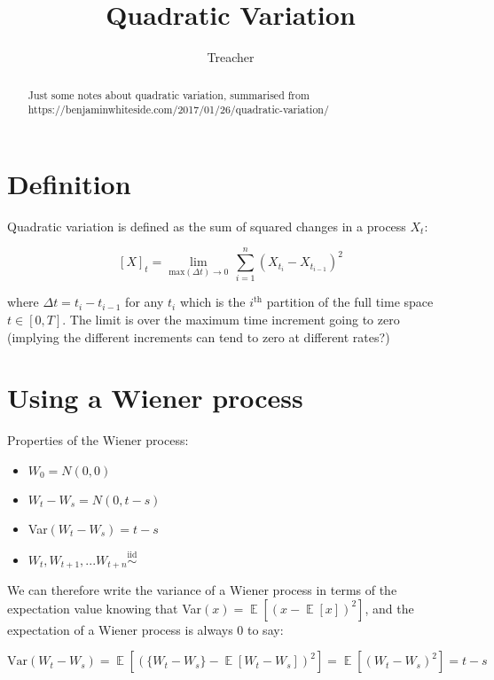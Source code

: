\documentclass[12pt]{article}
\title{Quadratic Variation}
\author{Treacher}
\newcommand{\iid}{\overset{\mathrm{\mathrm{iid}}}{\sim}}
\DeclareMathOperator*{\E}{\mathbb{E}}
\begin{document}
\date{}
\maketitle

\begin{abstract}

\noindent Just some notes about quadratic variation, summarised from\\ https://benjaminwhiteside.com/2017/01/26/quadratic-variation/

\end{abstract}

\section{Definition}

Quadratic variation is defined as the sum of squared changes in a process $X_t$:

\begin{equation} \label{eq:QuadraticVariation}
	[X]_t =\lim\limits_{\mathrm{max}(\Delta t)\to 0}\,\sum_{i=1}^n\left(X_{t_i} - X_{t_{i-1}}\right)^2
\end{equation}

\noindent where $\Delta t = t_i - t_{i-1}$ for any $t_i$ which is the $i^\mathrm{th}$ partition of the full time space $t\in [0,T]$. The limit is over the maximum time increment going to zero (implying the different increments can tend to zero at different rates?)



\section{Using a Wiener process}

Properties of the Wiener process:
\begin{itemize}
	\item $W_0 = N(0,0)$
	\item $W_t - W_s = N(0, t-s)$
	\item Var$(W_t - W_s) = t-s$
	\item $W_t, W_{t+1}, ... W_{t+n} \iid$
\end{itemize}

\noindent We can therefore write the variance of a Wiener process in terms of the expectation value knowing that Var$(x) = \E[(x - \E[x])^2]$, and the expectation of a Wiener process is always 0 to say:

\begin{equation} \label{eq:VartoE}
	\mathrm{Var}(W_t - W_s) = \E[(\{W_t - W_s\} - \E[W_t - W_s])^2] = \E[(W_t - W_s)^2] = t - s
\end{equation}
\end{document}
